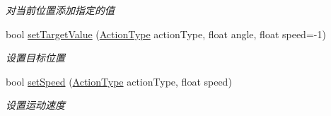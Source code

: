 \begin{DoxyCompactItemize}
\begin{DoxyCompactList}\small\item\em 对当前位置添加指定的值 \end{DoxyCompactList}\item 
\hypertarget{class_model_a988c677235850227b0282994e3fb1a48}{}bool \hyperlink{class_model_a988c677235850227b0282994e3fb1a48}{set\+Target\+Value} (\hyperlink{class_model_a639d17254535dbda93359bed8722e6c7}{Action\+Type} action\+Type, float angle, float speed=-\/1)\label{class_model_a988c677235850227b0282994e3fb1a48}

\begin{DoxyCompactList}\small\item\em 设置目标位置 \end{DoxyCompactList}\item 
bool \hyperlink{class_model_adb81699a23798935e5f5e83e804a8c3f}{set\+Speed} (\hyperlink{class_model_a639d17254535dbda93359bed8722e6c7}{Action\+Type} action\+Type, float speed)
\begin{DoxyCompactList}\small\item\em 设置运动速度 \end{DoxyCompactList}\end{DoxyCompactItemize}

